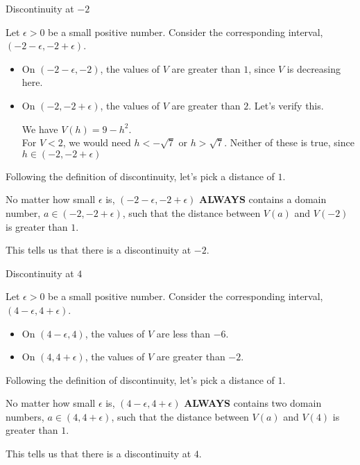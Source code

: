 \documentclass{ximera}
\begin{document}
\begin{explanation} Discontinuity at $-2$


Let $\epsilon > 0$ be a small positive number.  Consider the corresponding interval, $(-2 - \epsilon, -2 + \epsilon)$.

\begin{itemize}
\item On $(-2 - \epsilon, -2)$, the values of $V$ are greater than $1$, since $V$ is decreasing here.
\item On $(-2, -2 + \epsilon)$, the values of $V$ are greater than $2$.  Let's verify this.



We have $V(h) = 9 - h^2$. \\

For $V < 2$, we would need $h < -\sqrt{7}$ or $h > \sqrt{7}$.  Neither of these is true, since $h \in (-2, -2 + \epsilon)$


\end{itemize}



Following the definition of discontinuity, let's pick a distance of $1$.


No matter how small $\epsilon$ is, $(-2 - \epsilon, -2 + \epsilon)$ \textbf{\textcolor{red!90!darkgray}{ALWAYS}} contains a domain number, $a \in (-2, -2 + \epsilon)$, such that the distance between $V(a)$ and $V(-2)$ is greater than $1$.

This tells us that there is a discontinuity at $-2$.

\end{explanation}





\begin{explanation} Discontinuity at $4$


Let $\epsilon > 0$ be a small positive number.  Consider the corresponding interval, $(4 - \epsilon, 4 + \epsilon)$.

\begin{itemize}
\item On $(4 - \epsilon, 4)$, the values of $V$ are less than $-6$.
\item On $(4, 4 + \epsilon)$, the values of $V$ are greater than $-2$.
\end{itemize}


Following the definition of discontinuity, let's pick a distance of $1$.


No matter how small $\epsilon$ is, $(4 - \epsilon, 4 + \epsilon)$ \textbf{\textcolor{red!90!darkgray}{ALWAYS}} contains two domain numbers, $a \in (4, 4 + \epsilon)$, such that the distance between $V(a)$ and $V(4)$ is greater than $1$.

This tells us that there is a discontinuity at $4$.

\end{explanation}
\end{document}
